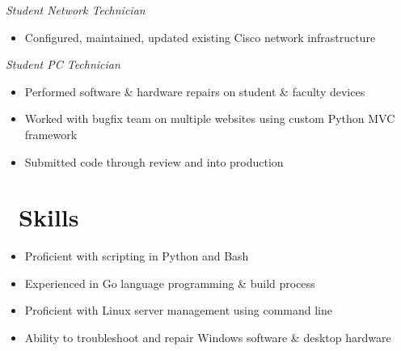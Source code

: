 \documentclass{resume}
\begin{document}
\textit{Student Network Technician}
\begin{itemize}
  \item Configured, maintained, updated existing Cisco network infrastructure
\end{itemize}
\textit{Student PC Technician}
\begin{itemize}
  \item Performed software \& hardware repairs on student \& faculty devices
\end{itemize}

\begin{itemize}
  \item Worked with bugfix team on multiple websites using custom Python MVC framework
  \item Submitted code through review and into production
\end{itemize}

\section{\faCogs\ Skills}
\begin{itemize}[parsep=0.5ex]
  \item Proficient with scripting in Python and Bash
  \item Experienced in Go language programming \& build process
  \item Proficient with Linux server management using command line
  \item Ability to troubleshoot and repair Windows software \& desktop hardware
\end{itemize}
\end{document}
